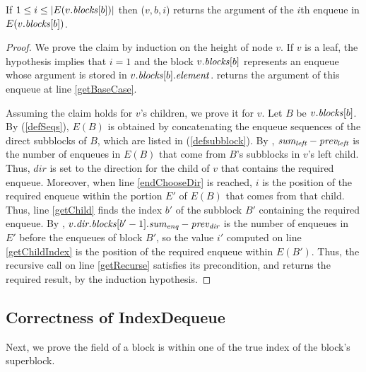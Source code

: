 \begin{lemma}\label{lem::get}
If $1\leq i\leq |E(v.\mbox{\textit{blocks}}[b])|$ then ($v,b,i$) returns the argument of the $i$th enqueue in $E(v.\mbox{\textit{blocks}}[b])$.
\end{lemma}
\begin{proof}
We prove the claim by induction on the height of node $v$.
If $v$ is a leaf, the hypothesis implies that $i=1$ and the block $v.\mbox{\textit{blocks}}[b]$ represents 
an enqueue whose argument is stored in $v.\mbox{\textit{blocks}}[b].\mbox{\textit{element}}$.
 returns the argument of this enqueue at line \ref{getBaseCase}.

Assuming the claim holds for $v$'s children, we prove it for $v$.
Let $B$ be $v.\mbox{\textit{blocks}}[b]$.
By (\ref{defSeqs}),
$E(B)$ is obtained by concatenating the enqueue sequences of the direct subblocks
of $B$, which are listed in (\ref{defsubblock}).
By , $\mbox{\textit{sum\textsubscript{left}}}-\mbox{\textit{prev\textsubscript{left}}}$ is the number
of enqueues in $E(B)$ that come from $B$'s subblocks in $v$'s left child.
Thus, $dir$ is set to the direction for the child of $v$ that contains the required enqueue.
Moreover, when line \ref{endChooseDir} is reached, $i$ is the position of the required enqueue within the portion $E'$ of $E(B)$ that comes from that child.
Thus,  line \ref{getChild} finds the index $b'$ of the subblock $B'$ containing the required enqueue.
By , $v.\mbox{\textit{dir.blocks}}[b'-1].\mbox{\textit{sum\textsubscript{enq}}} - \mbox{\textit{prev\textsubscript{dir}}}$ is the number of 
enqueues in $E'$ before the enqueues of block $B'$, so
the value $i'$ computed on line \ref{getChildIndex} is the position of the required enqueue within $E(B')$.
Thus, the recursive call on line \ref{getRecurse} satisfies its precondition, and 
returns the required result, by the induction hypothesis.
\end{proof}

\subsection{Correctness of IndexDequeue}

Next, we prove the  field of a block is within one of the true index of the block's superblock.

